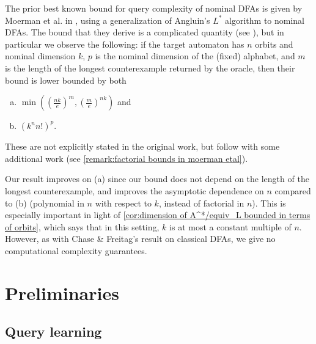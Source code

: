 \documentclass[11pt,a4paper]{amsart}
\theoremstyle{definition}
\begin{document}
The prior best known bound for query complexity of nominal DFAs is given by Moerman et al. in \cite{moerman-etal:learning-nominal-automata}, using a generalization of Angluin's $L^*$ algorithm to nominal DFAs. The bound that they derive is a complicated quantity (see \cite[Corollary 1]{moerman-etal:learning-nominal-automata}), but in particular we observe the following: if the target automaton has $n$ orbits and nominal dimension $k$, $p$ is the nominal dimension of the (fixed) alphabet, and $m$ is the length of the longest counterexample returned by the oracle, then their bound is lower bounded by both
\begin{enumerate}[(a)]
    \item $\min\left(\left(\frac{nk}{e}\right)^m, \left(\frac{m}{e}\right)^{nk}\right)$ and 
    \item $(k^n n!)^p$.
\end{enumerate}
These are not explicitly stated in the original work, but follow with some additional work (see \autoref{remark:factorial bounds in moerman etal}).

Our result improves on (a) since our bound does not depend on the length of the longest counterexample, and improves the asymptotic dependence on $n$ compared to (b) (polynomial in $n$ with respect to $k$, instead of factorial in $n$).
This is especially important in light of \autoref{cor:dimension of A^*/equiv_L bounded in terms of orbits}, which says that in this setting, $k$ is at most a constant multiple of $n$.
However, as with Chase \& Freitag's result on classical DFAs, we give no computational complexity guarantees. 


\section{Preliminaries} \label{section:preliminaries}

\subsection{Query learning}
\end{document}
